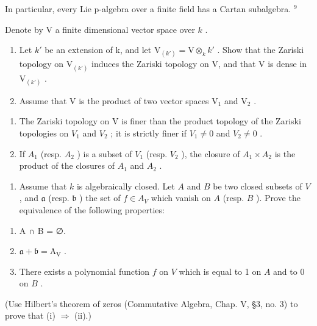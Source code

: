 In particular, every Lie p-algebra over a finite field has a Cartan subalgebra. \(^{9}\)


Denote by V a finite dimensional vector space over \(k\) .

\begin{enumerate}
\def\labelenumi{\arabic{enumi})}
\item
  Let \(k'\) be an extension of k, and let \(\mathrm{V}_{(k')} = \mathrm{V} \otimes_k k'\) . Show that the Zariski topology on \(\mathrm{V}_{(k')}\) induces the Zariski topology on V, and that V is dense in \(\mathrm{V}_{(k')}\) .
\item
  Assume that \(\mathrm{V}\) is the product of two vector spaces \(\mathrm{V}_1\) and \(\mathrm{V}_2\) .
\end{enumerate}

\begin{enumerate}
\def\labelenumi{\alph{enumi})}
\item
  The Zariski topology on V is finer than the product topology of the Zariski topologies on \(V_{1}\) and \(V_{2}\) ; it is strictly finer if \(V_{1} \neq 0\) and \(V_{2} \neq 0\) .
\item
  If \(A_{1}\) (resp. \(A_{2}\) ) is a subset of \(V_{1}\) (resp. \(V_{2}\) ), the closure of \(A_{1} \times A_{2}\) is the product of the closures of \(A_{1}\) and \(A_{2}\) .
\end{enumerate}

\begin{enumerate}
\def\labelenumi{\arabic{enumi})}
\setcounter{enumi}{2}
\tightlist
\item
  Assume that \(k\) is algebraically closed. Let \(A\) and \(B\) be two closed subsets of \(V\) , and \(\mathfrak{a}\) (resp. \(\mathfrak{b}\) ) the set of \(f \in A_V\) which vanish on \(A\) (resp. \(B\) ). Prove the equivalence of the following properties:
\end{enumerate}

\begin{enumerate}
\def\labelenumi{(\roman{enumi})}
\item
  A ∩ B = ∅.
\item
  \(\mathfrak{a} + \mathfrak{b} = \mathrm{A_V}\) .
\item
  There exists a polynomial function \(f\) on \(V\) which is equal to 1 on \(A\) and to 0 on \(B\) .
\end{enumerate}

(Use Hilbert's theorem of zeros (Commutative Algebra, Chap. V, §3, no. 3) to prove that (i) \(\Longrightarrow\) (ii).)

